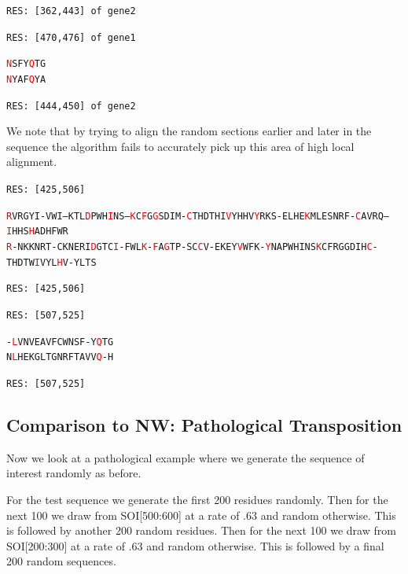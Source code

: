 \documentclass[phd,tocprelim]{cornell}
\begin{document}
\begin{flushleft}
\texttt{RES: [362,443] of gene2}

\texttt{RES: [470,476] of gene1}

\texttt{\textcolor{red}{N}SFY\textcolor{red}{Q}TG} \\
\texttt{\textcolor{red}{N}YAF\textcolor{red}{Q}YA}

\texttt{RES: [444,450] of gene2}

\normalsize
\normalspacing
\end{flushleft}

We note that by trying to align the random sections earlier and later in the sequence the algorithm fails to accurately pick up this area of high local alignment.

\begin{flushleft}
    \singlespacing
\footnotesize 
\texttt{RES: [425,506]}

\texttt{\textcolor{red}{R}VRGYI-VWI--KTL\textcolor{red}{D}PWH\textcolor{red}{I}NS--\textcolor{red}{K}C\textcolor{red}{F}G\textcolor{red}{G}SDIM-\textcolor{red}{C}THDTHI\textcolor{red}{V}YHHV\textcolor{red}{Y}RKS-ELHE\textcolor{red}{K}MLESNRF-\textcolor{red}{C}AVRQ--\textcolor{red}{I}HHS\textcolor{red}{H}ADHFWR} \\
\texttt{\textcolor{red}{R}-NKKNRT-CKNERI\textcolor{red}{D}GTC\textcolor{red}{I}-FWL\textcolor{red}{K}-\textcolor{red}{F}A\textcolor{red}{G}TP-SC\textcolor{red}{C}V-EKEY\textcolor{red}{V}WFK-\textcolor{red}{Y}NAPWHINS\textcolor{red}{K}CFRGGDIH\textcolor{red}{C}-THDTW\textcolor{red}{I}VYL\textcolor{red}{H}V-YLTS}

\texttt{RES: [425,506]}

\texttt{RES: [507,525]}

\texttt{-\textcolor{red}{L}VNVEAVFCWNSF-Y\textcolor{red}{Q}TG} \\
\texttt{N\textcolor{red}{L}HEKGLTGNRFTAVV\textcolor{red}{Q}-H}

\texttt{RES: [507,525]}

\normalsize
\normalspacing
\end{flushleft}

\subsection{Comparison to NW: Pathological Transposition}

Now we look at a pathological example where we generate the sequence of interest randomly as before.

For the test sequence we generate the first 200 residues randomly. Then for the next 100 we draw from SOI[500:600] at a rate of .63 and random otherwise. This is followed by another 200 random residues. Then for the next 100 we draw from SOI[200:300] at a rate of .63 and random otherwise. This is followed by a final 200 random sequences.
\end{document}
